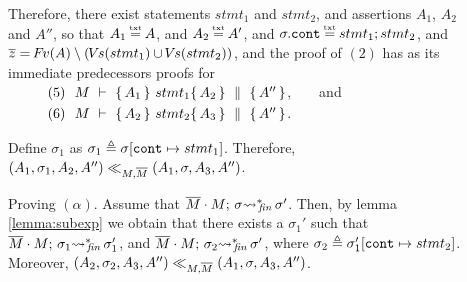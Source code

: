 {\begin{description}
\item[{}] 
Therefore, there exist statements $stmt_1$ and $stmt_2$, and assertions  $A_1$, $A_2$ and $A''$, so that $A_1\txteq A$, and $A_2 \txteq A'$, and $\sigma.\prg{cont}\txteq  stmt_1; stmt_2$, and $\overline z = {\hspace{-1pt}F\hspace{-1pt}}v(A) \setminus ({\hspace{-1pt}V\hspace{-1pt}}s(stmt_1) \cup {\hspace{-1pt}V\hspace{-1pt}}s(stmt_2))$, and
the proof of  $(2)$ %
has as its immediate predecessors proofs for \\
$\strut \ \ \hspace{0.5cm} \ \  (5)\ \ M\ \vdash\   \{\, A_1 \, \}\ stmt_1 \{\, A_2 \, \} \, \,\parallel\,\, \{\, A'' \, \} $,\ \ \ \  and\\
$\strut \ \ \hspace{0.5cm} \ \  (6)\ \  M\ \vdash\   \{\, A_2 \, \}\ stmt_2 \{\, A_3 \, \} \, \,\parallel\,\, \{\, A'' \, \} $.

Define $\sigma_1$ as  $\sigma_1 \triangleq \sigma[\mbox{\normalfont{\texttt{cont}}} \mapsto stmt_1]$.
Therefore,  $(A_1,\sigma_1,A_2, A'') \ll_{M,\overline{M}} (A_1,\sigma,A_3, A'')$. 

\vspace{.1cm}
Proving $(\alpha)$. Assume that $\overline{M}\cdot M;\, {\sigma} {\rightsquigarrow^*}\!\!_{\mathit{fin}}\, \sigma'$. Then, by lemma \ref{lemma:subexp} we obtain that there exists a $\sigma_1'$ such that $\overline{M}\cdot M;\, {\sigma_1} {\rightsquigarrow^*}\!\!_{\mathit{fin}}\, \sigma_1'$,
and $\overline{M}\cdot M;\, {\sigma_2} {\rightsquigarrow^*}\!\!_{\mathit{fin}}\, \sigma'$, where $\sigma_2 \triangleq \sigma_1'[\mbox{\normalfont{\texttt{cont}}} \mapsto stmt_2]$. Moreover,  $(A_2,\sigma_2,A_3,A'') \ll_{M,\overline{M}} (A_1,\sigma,A_3, A'')$.


\end{description}}
